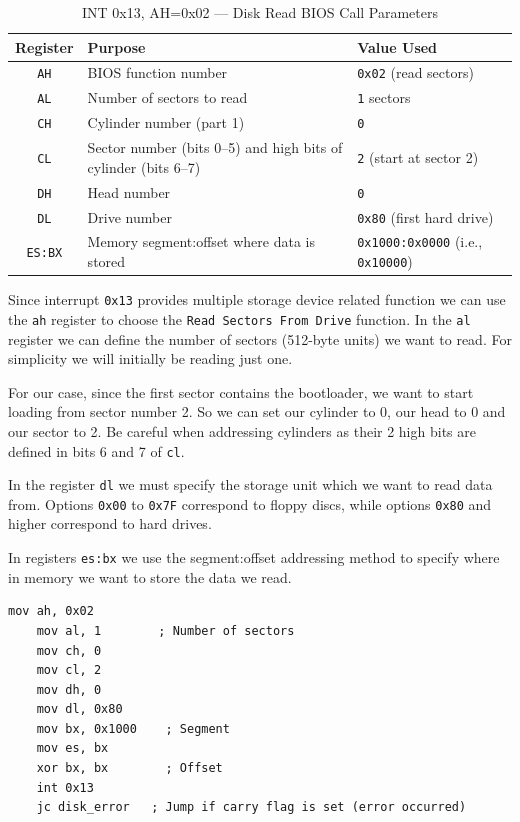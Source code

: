 \begin{table}[h]
    \centering
    \begin{tabular}{|c|p{5cm}|p{4cm}|}
    \hline
    \textbf{Register} & \textbf{Purpose} & \textbf{Value Used} \\ \hline
    \texttt{AH} & BIOS function number & \texttt{0x02} (read sectors) \\ \hline
    \texttt{AL} & Number of sectors to read & \texttt{1} sectors \\ \hline
    \texttt{CH} & Cylinder number (part 1) & \texttt{0} \\ \hline
    \texttt{CL} & Sector number (bits 0–5) and high bits of cylinder (bits 6–7) & \texttt{2} (start at sector 2) \\ \hline
    \texttt{DH} & Head number & \texttt{0} \\ \hline
    \texttt{DL} & Drive number & \texttt{0x80} (first hard drive) \\ \hline
    \texttt{ES:BX} & Memory segment:offset where data is stored & \texttt{0x1000:0x0000} (i.e., \texttt{0x10000}) \\ \hline
    \end{tabular}
    \caption{INT 0x13, AH=0x02 — Disk Read BIOS Call Parameters}
    \label{tab:disk_read_params}
\end{table}
    
Since interrupt \texttt{0x13} provides multiple storage device related function we can use the \texttt{ah} register
to choose the \texttt{Read Sectors From Drive} function.
In the \texttt{al} register we can define the number of sectors (512-byte units) we want to read. For simplicity
we will initially be reading just one.

For our case, since the first sector contains the bootloader, we want to start loading from sector number 2.
So we can set our cylinder to 0, our head to 0 and our sector to 2. Be careful when addressing cylinders
as their 2 high bits are defined in bits 6 and 7 of \texttt{cl}.

In the register \texttt{dl} we must specify the storage unit which we want to read data from.
Options \texttt{0x00} to \texttt{0x7F} correspond to floppy discs, while options \texttt{0x80} and higher
correspond to hard drives.

In registers \texttt{es:bx} we use the segment:offset addressing method to specify where in memory we want
to store the data we read.

\begin{lstlisting}[caption={Assembly to load the kernel}]
    mov ah, 0x02
    mov al, 1        ; Number of sectors
    mov ch, 0
    mov cl, 2
    mov dh, 0
    mov dl, 0x80
    mov bx, 0x1000    ; Segment
    mov es, bx
    xor bx, bx        ; Offset
    int 0x13
    jc disk_error   ; Jump if carry flag is set (error occurred)
\end{lstlisting}

